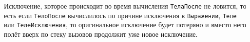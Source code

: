 
Исключение, которое происходит во время вычисления \texttt{ТелаПосле} не 
ловится, то есть если \texttt{ТелоПосле} вычислилось по причине исключения в 
\texttt{Выражении}, \texttt{Теле} или \texttt{ТелеИсключения}, то оригинальное
исключение будет потеряно и вместо него полёт вверх по стеку вызовов продолжит 
уже новое исключение.

